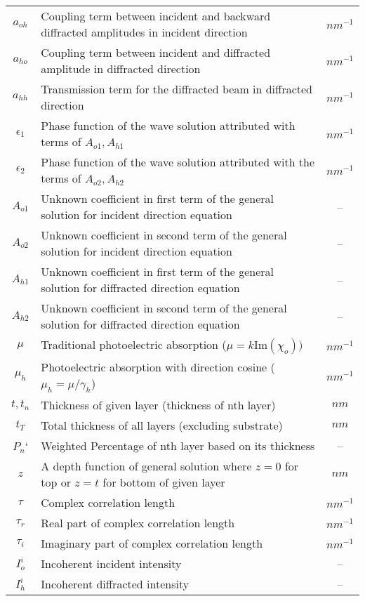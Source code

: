 \begin{table}
\begin{longtable}{|c|l|c|}
$a_{oh}$        & Coupling term between incident and backward diffracted amplitudes in incident direction &$ nm^{-1}$\\
$a_{ho}$        & Coupling term between incident and diffracted amplitude in diffracted direction & $ nm^{-1}$\\
$a_{hh}$        & Transmission term for the diffracted beam in diffracted direction & $ nm^{-1}$\\
$\epsilon_1$	& Phase function of the wave solution attributed with terms of $A_{o1},A_{h1}$ & $ nm^{-1}$\\
$\epsilon_2$	& Phase function of the wave solution attributed with the terms of $A_{o2},A_{h2}$ &$ nm^{-1}$\\
$A_{o1}$				& Unknown coefficient in first term of the general solution for incident direction equation & --\\
$A_{o2}$				& Unknown coefficient in second term of the general solution for incident direction equation & --\\
$A_{h1}$				&Unknown coefficient in first term of the general solution for diffracted direction equation &--\\
$A_{h2}$				&Unknown coefficient in second term of the general solution for diffracted direction equation &--\\
$\mu$          & Traditional photoelectric absorption ($\mu=k \text{Im}(\chi_o))$  &$ nm^{-1}$\\
$\mu_h$         & Photoelectric absorption with direction cosine ($\mu_h=\mu /\gamma_h$)  &$ nm^{-1}$\\
$t,t_n$           & Thickness of given layer (thickness of nth layer) & $nm$ \\
$t_T$					& Total thickness of all layers (excluding substrate) & $nm$ \\
$P_n$`				& Weighted Percentage of nth layer based on its thickness & --\\
$z$						& A depth function of general solution where $z=0$ for top or $z=t$ for bottom of given layer & $nm$ \\
$\tau$         & Complex correlation length  &$ nm^{-1}$\\
$\tau_r$        & Real part of complex correlation length  &$ nm^{-1}$\\
$\tau_i$         & Imaginary part of complex correlation length  &$ nm^{-1}$\\
$I^i_o$         & Incoherent incident intensity &--\\
$I^i_h$         & Incoherent diffracted intensity &--\\

\end{longtable}
\end{table}
